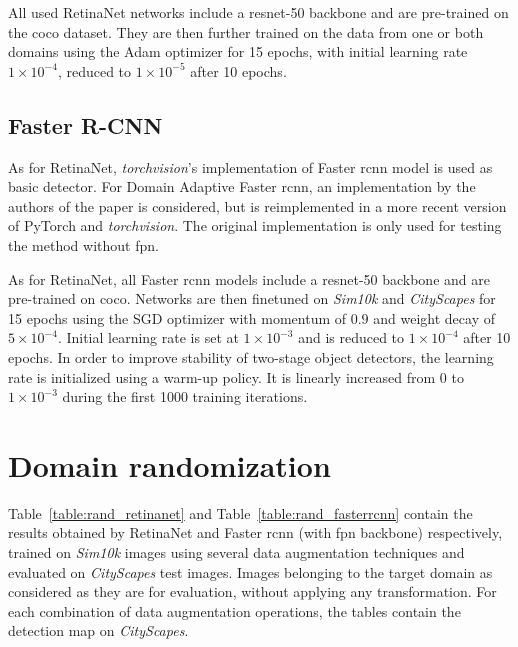 \documentclass[%
    corpo=12pt,
    twoside,
    stile=classica,   
    tipotesi=magistrale,
    evenboxes,
    english,
	numerazioneromana,
]{toptesi}
\begin{document}
\bigskip
All used RetinaNet networks include a \gls{resnet}-50 backbone and are pre-trained on the \gls{coco} dataset. They are then further trained on the data from one or both domains using the Adam optimizer for 15 epochs, with initial learning rate $1\times 10^{-4}$, reduced to $1\times 10^{-5}$ after 10 epochs.

\subsection{Faster R-CNN}
As for RetinaNet, \textit{torchvision}'s implementation of Faster \gls{rcnn} model is used as basic detector\cite{torchvision_fasterrcnn}. For Domain Adaptive Faster \gls{rcnn}, an implementation by the authors of the paper\cite{chen2018domain} is considered\cite{dafasterrcnn_github}, but is reimplemented in a more recent version of PyTorch and \textit{torchvision}. The original implementation is only used for testing the method without \gls{fpn}.

\bigskip
As for RetinaNet, all Faster \gls{rcnn} models include a \gls{resnet}-50 backbone and are pre-trained on \gls{coco}. Networks are then finetuned on \textit{Sim10k} and \textit{CityScapes} for 15 epochs using the SGD optimizer with momentum of $0.9$ and weight decay of $5\times 10^{-4}$. Initial learning rate is set at $1\times 10^{-3}$ and is reduced to $1\times 10^{-4}$ after 10 epochs.  In order to improve stability of two-stage object detectors, the learning rate is initialized using a warm-up policy. It is linearly increased from 0 to $1 \times 10^{-3}$ during the first 1000 training iterations.

\section{Domain randomization}
Table~\ref{table:rand_retinanet} and Table~\ref{table:rand_fasterrcnn} contain the results obtained by RetinaNet and Faster \gls{rcnn} (with \gls{fpn} backbone) respectively, trained on \textit{Sim10k} images using several data augmentation techniques and evaluated on \textit{CityScapes} test images. Images belonging to the target domain as considered as they are for evaluation, without applying any transformation. For each combination of data augmentation operations, the tables contain the detection \gls{map} on \textit{CityScapes}.
\end{document}
